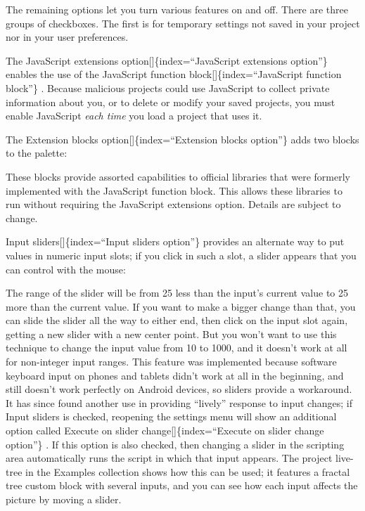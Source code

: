 \documentclass[
  letterpaper,
]{book}
\begin{document}
The remaining options let you turn various features on and off. There
are three groups of checkboxes. The first is for temporary settings not
saved in your project nor in your user preferences.

The JavaScript extensions option{[}{]}\{index=``JavaScript extensions
option''\} enables the use of the JavaScript function
block{[}{]}\{index=``JavaScript function block''\} . Because malicious
projects could use JavaScript to collect private information about you,
or to delete or modify your saved projects, you must enable JavaScript
\emph{each time} you load a project that uses it.

The Extension blocks option{[}{]}\{index=``Extension blocks option''\}
adds two blocks to the palette:

These blocks provide assorted capabilities to official libraries that
were formerly implemented with the JavaScript function block. This
allows these libraries to run without requiring the JavaScript
extensions option. Details are subject to change.

Input sliders{[}{]}\{index=``Input sliders option''\} provides an
alternate way to put values in numeric input slots; if you click in such
a slot, a slider appears that you can control with the mouse:

The range of the slider will be from 25 less than the input's current
value to 25 more than the current value. If you want to make a bigger
change than that, you can slide the slider all the way to either end,
then click on the input slot again, getting a new slider with a new
center point. But you won't want to use this technique to change the
input value from 10 to 1000, and it doesn't work at all for non-integer
input ranges. This feature was implemented because software keyboard
input on phones and tablets didn't work at all in the beginning, and
still doesn't work perfectly on Android devices, so sliders provide a
workaround. It has since found another use in providing ``lively''
response to input changes; if Input sliders is checked, reopening the
settings menu will show an additional option called Execute on slider
change{[}{]}\{index=``Execute on slider change option''\} . If this
option is also checked, then changing a slider in the scripting area
automatically runs the script in which that input appears. The project
live-tree in the Examples collection shows how this can be used; it
features a fractal tree custom block with several inputs, and you can
see how each input affects the picture by moving a slider.
\end{document}
